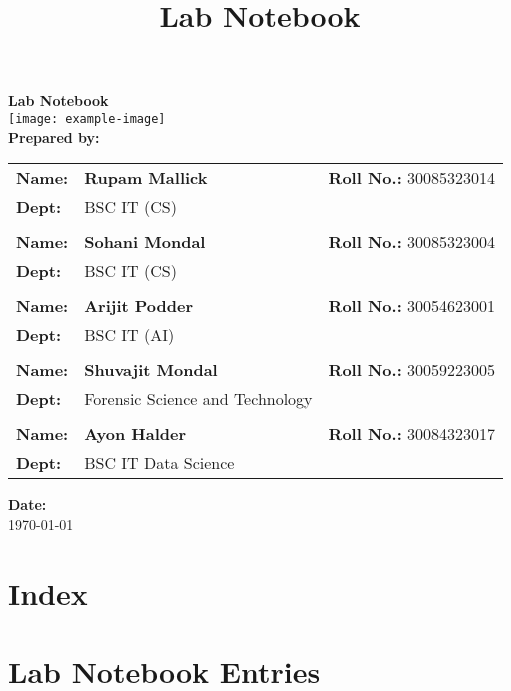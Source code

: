 \documentclass[a4paper,12pt]{article}
\title{\Huge \textbf{Lab Notebook}\\[1.5cm]}
\author{}
\date{}
\begin{document}
\begin{titlingpage}
    \centering
    \vspace*{4cm}
    {\Huge \bfseries Lab Notebook}\\[1.5cm]
    
    \texttt{[image: example-image]} \\[1cm]
    
    {\Large \textbf{Prepared by:}} \\[1cm]
    
    \begin{tabular}{lll}
        \textbf{Name:} & \textbf{Rupam Mallick} & \textbf{Roll No.:} 30085323014 \\
        \textbf{Dept:} & BSC IT (CS) & \\
        \\
        \textbf{Name:} & \textbf{Sohani Mondal} & \textbf{Roll No.:} 30085323004 \\
        \textbf{Dept:} & BSC IT (CS) & \\
        \\
        \textbf{Name:} & \textbf{Arijit Podder} & \textbf{Roll No.:} 30054623001 \\
        \textbf{Dept:} & BSC IT (AI) & \\
        \\
        \textbf{Name:} & \textbf{Shuvajit Mondal} & \textbf{Roll No.:} 30059223005 \\
        \textbf{Dept:} & Forensic Science and Technology & \\
        \\
        \textbf{Name:} & \textbf{Ayon Halder} & \textbf{Roll No.:} 30084323017 \\
        \textbf{Dept:} & BSC IT Data Science &
    \end{tabular}
    
    \vfill
    {\Large \textbf{Date:}} \\[0.5cm]
    {\large \today}
\end{titlingpage}

\newpage

\section*{Index}
\tableofcontents
\newpage

\section{Lab Notebook Entries}
\end{document}
